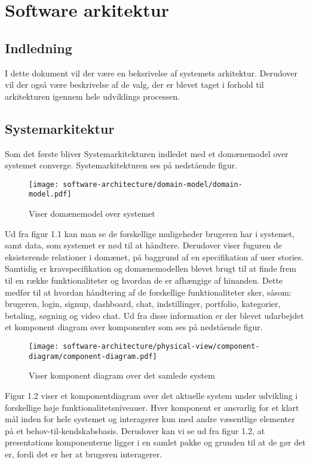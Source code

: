 \chapter{Software arkitektur}

\section{Indledning}

I dette dokument vil der være en beksrivelse af systemets arkitektur. 
Derudover vil der også være beskrivelse af de valg, der er blevet taget i forhold til arkitekturen igennem hele udviklings processen. 

\section{Systemarkitektur}
Som det første bliver Systemarkitekturen indledet med et domænemodel over systemet converge. Systemarkitekturen ses på nedstående figur.

\begin{figure}[ht]
    \centering
\texttt{[image: software-architecture/domain-model/domain-model.pdf]}
\caption{Viser domænemodel over systemet}
\label{fig:figure4}
\end{figure}

Ud fra figur 1.1 kan man se de forskellige muligeheder brugeren har i systemet, samt data, som systemet er nød til at håndtere. Derudover viser fuguren  de eksisterende relationer i domænet, på baggrund af en specifikation af user stories. 
Samtidig er kravspecifikation og domænemodellen blevet brugt til at finde frem til en række funktionaliteter og hvordan de er afhængige af hinanden. Dette medfør til at hvordan håndtering af de forskellige funktionaliteter sker, såsom: brugeren, login, signup, dashboard, chat, indstillinger, portfolio, kategorier, betaling, søgning og video chat. Ud fra disse information er der blevet udarbejdet et komponent diagram over komponenter som ses på nedstående figur.

\newpage
\begin{figure}[ht]
    \centering
\texttt{[image: software-architecture/physical-view/component-diagram/component-diagram.pdf]}
\caption{Viser komponent diagram over det samlede system}
\label{fig:figure2}
\end{figure}

Figur 1.2 viser et komponentdiagram over det aktuelle system under udvikling i forskellige høje funktionalitetsniveauer. Hver komponent er ansvarlig for et klart mål inden for hele systemet og interagerer kun med andre væsentlige elementer på et behov-til-kendskabsbasis. Derudover kan vi se ud fra figur 1.2, at presentations komponenterne ligger i en samlet pakke og grunden til at de gør det er, fordi det er her at brugeren interagerer.

